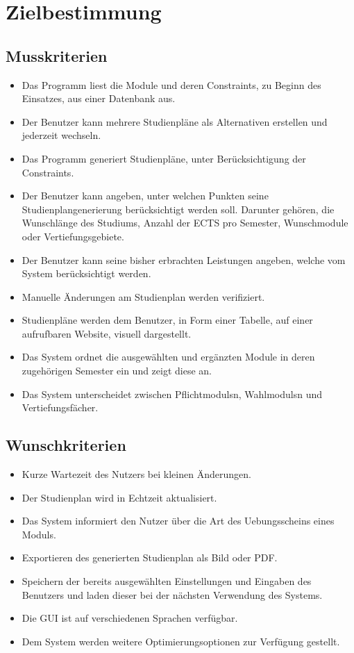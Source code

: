 \documentclass[parskip=full]{scrartcl}
\begin{document}
	\section{Zielbestimmung}
	
		\subsection{Musskriterien}
		
			\begin{itemize}
				\item Das Programm liest die Module und deren Constraints, zu Beginn des Einsatzes, aus einer Datenbank aus.
				\item Der Benutzer kann mehrere Studienpläne als Alternativen erstellen und jederzeit wechseln.
				\item Das Programm generiert Studienpläne, unter Berücksichtigung der Constraints.
				\item Der Benutzer kann angeben, unter welchen Punkten seine Studienplangenerierung berücksichtigt werden soll. Darunter gehören, die Wunschlänge des Studiums, Anzahl der ECTS pro Semester, Wunschmodule oder Vertiefungsgebiete.
				\item Der Benutzer kann seine bisher erbrachten Leistungen angeben, welche vom System berücksichtigt werden.
				\item Manuelle Änderungen am Studienplan werden verifiziert.
				\item Studienpläne werden dem Benutzer, in Form einer Tabelle, auf einer aufrufbaren Website, visuell dargestellt.
				\item Das System ordnet die ausgewählten und ergänzten Module in deren zugehörigen Semester ein und zeigt diese an.
				\item Das System unterscheidet zwischen \glspl{Pflichtmodul}n, \glspl{Wahlmodul}n und Vertiefungsfächer.
			\end{itemize}
	
		\subsection{Wunschkriterien}
			
			\begin{itemize}
				\item Kurze Wartezeit des Nutzers bei kleinen Änderungen.
				\item Der Studienplan wird in Echtzeit aktualisiert.
				\item Das System informiert den Nutzer über die Art des \gls{Uebungsschein}s eines Moduls.
				\item Exportieren des generierten Studienplan als Bild oder PDF.
				\item Speichern der bereits ausgewählten Einstellungen und Eingaben des Benutzers und laden dieser bei der nächsten Verwendung des Systems.
				\item Die GUI ist auf verschiedenen Sprachen verfügbar.
				\item Dem System werden weitere Optimierungsoptionen zur Verfügung gestellt.
			\end{itemize}
	
\end{document}
